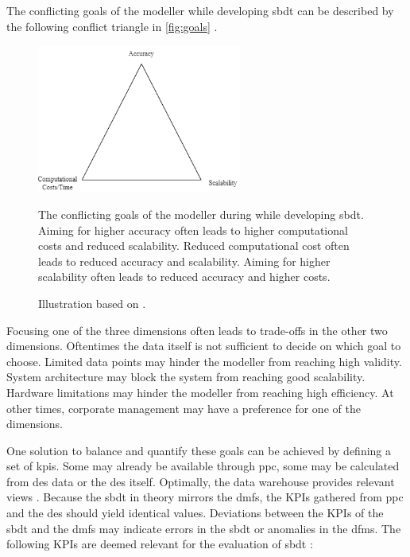 The conflicting goals of the modeller while developing \gls{sbdt} can be described by the following conflict triangle in \autoref{fig:goals} \autocite{robinson2014simulation,balci2012life}.

\begin{figure}[htbp]
  \centering
  \includegraphics[width=0.6\textwidth]{figures/goals.png}
  \caption[Conflict Triangle]{The conflicting goals of the modeller during while developing \gls{sbdt}. Aiming for higher accuracy often leads to higher computational costs and reduced scalability. Reduced computational cost often leads to reduced accuracy and scalability. Aiming for higher scalability often leads to reduced accuracy and higher costs.}
  \label{fig:goals}
  \caption*{Illustration based on \autocite{robinson2014simulation,balci2012life}.}
\end{figure}

Focusing one of the three dimensions often leads to trade-offs in the other two dimensions. Oftentimes the data itself is not sufficient to decide on which goal to choose. Limited data points may hinder the modeller from reaching high validity. System architecture may block the system from reaching good scalability. Hardware limitations may hinder the modeller from reaching high efficiency.
At other times, corporate management may have a preference for one of the dimensions.

One solution to balance and quantify these goals can be achieved by defining a set of \gls{kpi}s. Some may already be available through \gls{ppc}, some may be calculated from \gls{des} data or the \gls{des} itself. Optimally, the data warehouse provides relevant views \autocite{cui2020manufacturing}. Because the \gls{sbdt} in theory mirrors the \gls{dmfs}, the KPIs gathered from \gls{ppc} and the \gls{des} should yield identical values. Deviations between the KPIs of the \gls{sbdt} and the \gls{dmfs} may indicate errors in the \gls{sbdt} or anomalies in the \gls{dfms}. The following KPIs are deemed relevant for the evaluation of \gls{sbdt} \autocite{friederich2023framework}:

